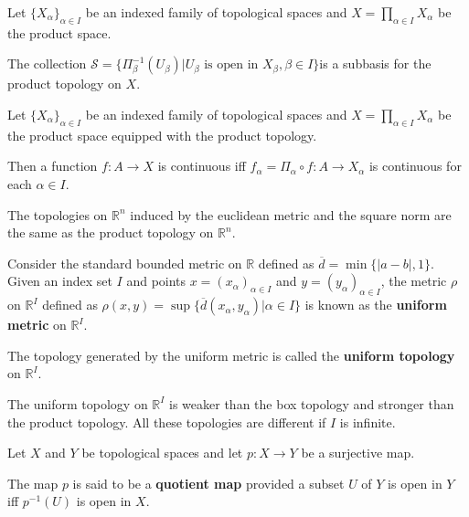 \begin{thm}
Let $\{ X_\alpha \}_{\alpha \in I}$ be an indexed family of topological spaces and $X = \prod_{\alpha \in I} X_\alpha$ be the product space. 

    The collection $\mathscr{S} = \{ \Pi^{-1}_\beta (U_\beta) | U_\beta \text{ is open in } X_\beta, \beta \in I \}$is a subbasis for the product topology on $X$.
\end{thm}

\begin{thm}
Let $\{ X_\alpha \}_{\alpha \in I}$ be an indexed family of topological spaces and $X = \prod_{\alpha \in I} X_\alpha$ be the product space equipped with the product topology.

    Then a function $f: A \to X$ is continuous iff $f_\alpha = \Pi_\alpha \circ f : A \to X_\alpha$ is continuous for each $\alpha \in I$.
\end{thm}

\begin{thm}
    The topologies on $\mathbb{R}^n$ induced by the euclidean metric and the square norm are the same as the product topology on $\mathbb{R}^n$.
\end{thm}

\begin{defn}
    Consider the standard bounded metric on $\mathbb{R}$ defined as $\overline{d} = \min\{ |a-b|, 1\}$.
    Given an index set $I$ and points $x = (x_\alpha)_{\alpha \in I}$ and $y = (y_\alpha)_{\alpha \in I}$, the metric $\rho$ on $\mathbb{R}^I$ defined  as $\rho(x,y) = \sup \{ \overline{d}(x_\alpha, y_\alpha) | \alpha \in I \}$ is known as the \textbf{uniform metric} on $\mathbb{R}^I$.

    The topology generated by the uniform metric is called the \textbf{uniform topology} on $\mathbb{R}^I$.
\end{defn}

\begin{thm}
    The uniform topology on $\mathbb{R}^I$ is weaker than the box topology and stronger than the product topology. 
    All these topologies are different if $I$ is infinite.
\end{thm}

\begin{defn}
    Let $X$ and $Y$ be topological spaces and let $p: X \to Y$ be a surjective map. 

    The map $p$ is said to be a \textbf{quotient map} provided a subset $U$ of $Y$ is open in $Y$ iff $p^{-1}(U)$ is open in $X$.
\end{defn}

